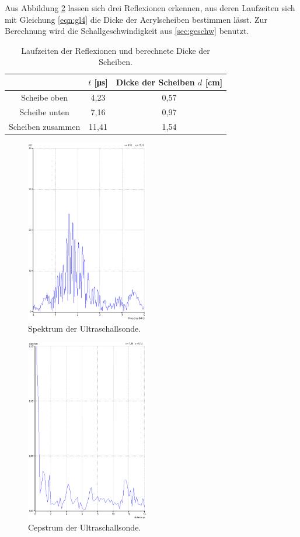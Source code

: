 Aus Abbildung \ref{fig:cep} lassen sich drei Reflexionen erkennen, aus deren Laufzeiten sich mit Gleichung \eqref{eqn:gl4} die Dicke der Acrylscheiben bestimmen lässt.
Zur Berechnung wird die Schallgeschwindigkeit aus \ref{sec:geschw} benutzt.
\begin{table}
  \centering
  \caption{Laufzeiten der Reflexionen und berechnete Dicke der Scheiben.}
  \label{tab:cep}
  \begin{tabular}{c c c}
    \toprule
    & $t$ [\si{\micro\second}] & Dicke der Scheiben $d$ [\si{\centi\meter}] \\
    \midrule
    Scheibe oben & 4,23 & 0,57\\
    Scheibe unten & 7,16 & 0,97\\
    Scheiben zusammen & 11,41 & 1,54 \\
    \bottomrule
  \end{tabular}
\end{table}
\begin{figure}
  \centering
  \includegraphics[height=8cm]{data/FFT.png}
  \caption{Spektrum der Ultraschallsonde.}
  \label{fig:FFT}
\end{figure}
\begin{figure}
  \centering
  \includegraphics[height=8cm]{data/Cepstrum.png}
  \caption{Cepstrum der Ultraschallsonde.}
  \label{fig:cep}
\end{figure}

